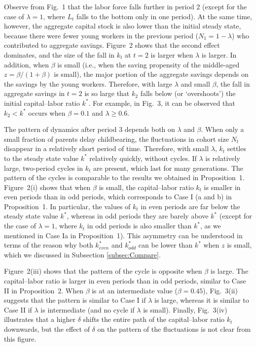 \documentclass{MBE}%
\begin{document}
{Observe from Fig.~1 that the labor force falls further in period 2 (except for the case of
$\lambda=1$, where $L_{t}$ falls to the bottom only in one period). At the same time, however, the
aggregate capital stock is also lower than the initial steady state, because there were fewer
young workers in the previous period ($N_{1}=1-\lambda$) who contributed to aggregate savings.
Figure~2 shows that the second effect dominates, and the size of the fall in $k_{t}$ at $t=2$ is
larger when $\lambda$ is larger. In addition, when $\beta$ is small (i.e., when the saving
propensity of the middle-aged $z=\beta/(1+\beta)$ is small), the major portion of the aggregate
savings depends on the savings by the young workers. Therefore, with large $\lambda$ and small
$\beta$, the fall in aggregate savings in $t=2$ is so large that $k_{2}$ falls below (or
`overshoots') the initial capital--labor ratio $k^{\ast}$. {For example, in Fig.~3, it can be
observed that $k_{2}<k^{\ast}$ occurs when $\beta=0.1$ and $\lambda\geq0.6$.}

The pattern of dynamics after period 3 depends both on $\lambda$ and $\beta$. When only a small
fraction of parents delay childbearing, the fluctuations in cohort size $N_{t}$ disappear in a
relatively short period of time. Therefore, with small $\lambda$, $k_{t}$ settles to the steady
state value $k^{\ast}$ relatively quickly, without cycles. If $\lambda$ is relatively large,
two-period cycles in $k_{t}$ are present, which last for many generations. The pattern of the
cycles is comparable to the results we obtained in Proposition~1. Figure~2(i) shows that when
$\beta$ is small, the capital--labor ratio $k_{t}$ is smaller in even periods than in odd periods,
which corresponds to Case I (a and b) in Proposition~1. In particular, the values of $k_{t}$ in
even periods are far below the steady state value $k^{\ast}$, whereas in odd periods they are
barely above $k^{\ast}$ (except for the case of $\lambda=1$, where $k_{t}$ in odd periods is also
smaller than $k^{\ast}$, as we mentioned in Case Ia in Proposition~1). This asymmetry can be
understood in terms of the reason why both $k_{even}^{\ast}$ and $k_{odd}^{\ast}$ can be lower
than $k^{\ast}$ when $z$ is small, which we discussed in Subsection \ref{subsec:Compare}.

Figure~2(iii) shows that the pattern of the cycle is opposite when $\beta$ is large. The
capital--labor ratio is larger in even periods than in odd periods, similar to Case II in
Proposition~2. When $\beta$ is at an intermediate value ($\beta =0.45$), Fig.~3(ii) suggests that
the pattern is similar to Case I if $\lambda$ is large, whereas it is similar to Case II if
$\lambda$ is intermediate (and no cycle if $\lambda$ is small). Finally, Fig.~3(iv) illustrates
that a higher $\delta$ shifts the entire path of the capital--labor ratio $k_{t}$ downwards, but
the effect of $\delta$ on the pattern of the fluctuations is not clear from this figure.

}
\end{document}
